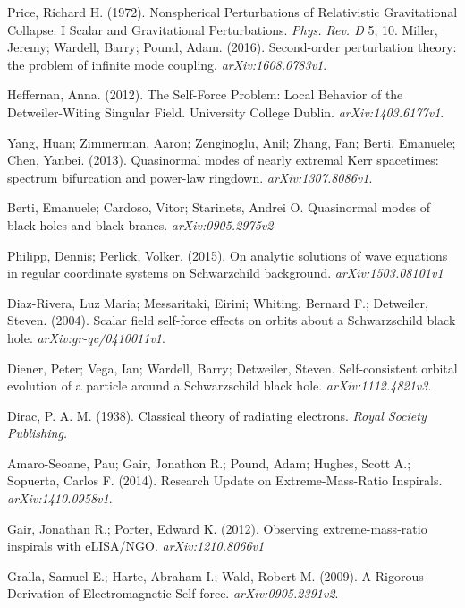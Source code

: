 Price, Richard H. (1972). Nonspherical Perturbations of Relativistic Gravitational Collapse. I Scalar and Gravitational Perturbations. {\em Phys. Rev. D} 5, 10. 
Miller, Jeremy; Wardell, Barry; Pound, Adam. (2016). Second-order perturbation theory: the problem of infinite mode coupling. {\em arXiv:1608.0783v1}.

Heffernan, Anna. (2012). The Self-Force Problem: Local Behavior of the Detweiler-Witing Singular Field. University College Dublin. {\em arXiv:1403.6177v1}.

Yang, Huan; Zimmerman, Aaron; Zenginoglu, Anil; Zhang, Fan; Berti, Emanuele; Chen, Yanbei. (2013). Quasinormal modes of nearly extremal Kerr spacetimes: spectrum bifurcation and power-law ringdown. {\em arXiv:1307.8086v1}.

Berti, Emanuele; Cardoso, Vitor; Starinets, Andrei O. Quasinormal modes of black holes and black branes. {\em arXiv:0905.2975v2}

Philipp, Dennis; Perlick, Volker. (2015). On analytic solutions of wave equations in regular coordinate systems on Schwarzchild background. {\em arXiv:1503.08101v1} 

Diaz-Rivera, Luz Maria; Messaritaki, Eirini; Whiting, Bernard F.; Detweiler, Steven. (2004). Scalar field self-force effects on orbits about a Schwarzschild black hole. {\em arXiv:gr-qc/0410011v1}.

Diener, Peter; Vega, Ian; Wardell, Barry; Detweiler, Steven. Self-consistent orbital evolution of a particle around a Schwarzschild black hole. {\em arXiv:1112.4821v3}.

Dirac, P. A. M. (1938). Classical theory of radiating electrons. {\em Royal Society Publishing.}

Amaro-Seoane, Pau; Gair, Jonathon R.; Pound, Adam; Hughes, Scott A.; Sopuerta, Carlos F. (2014). Research Update on Extreme-Mass-Ratio Inspirals. {\em arXiv:1410.0958v1}.

Gair, Jonathan R.; Porter, Edward K. (2012). Observing extreme-mass-ratio inspirals with eLISA/NGO. {\em arXiv:1210.8066v1}

Gralla, Samuel E.; Harte, Abraham I.; Wald, Robert M. (2009). A Rigorous Derivation of Electromagnetic Self-force. {\em arXiv:0905.2391v2}.

